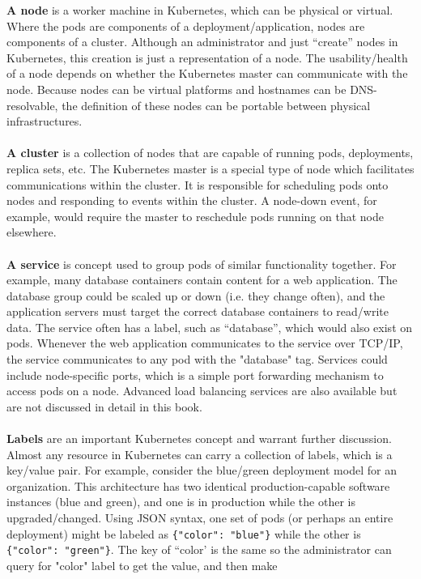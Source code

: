 \textbf{A node} is a worker machine in Kubernetes, which can be physical or
virtual. Where the pods are components of a deployment/application, nodes are
components of a cluster. Although an administrator and just ``create'' nodes in
Kubernetes, this creation is just a representation of a node. The
usability/health of a node depends on whether the Kubernetes master can
communicate with the node. Because nodes can be virtual platforms and
hostnames can be DNS-resolvable, the definition of these nodes can be portable
between physical infrastructures.
\\ \\
\textbf{A cluster} is a collection of nodes that are capable of running pods,
deployments, replica sets, etc. The Kubernetes master is a special type of
node which facilitates communications within the cluster. It is responsible
for scheduling pods onto nodes and responding to events within the cluster. A
node-down event, for example, would require the master to reschedule pods
running on that node elsewhere.
\\ \\
\textbf{A service} is concept used to group pods of similar functionality
together. For example, many database containers contain content for a web
application. The database group could be scaled up or down (i.e. they change
often), and the application servers must target the correct database
containers to read/write data. The service often has a label, such as
``database'', which would also exist on pods. Whenever the web application
communicates to the service over TCP/IP, the service communicates to any pod
with the "database" tag. Services could include node-specific ports, which is
a simple port forwarding mechanism to access pods on a node. Advanced load
balancing services are also available but are not discussed in detail in this book.
\\ \\
\textbf{Labels} are an important Kubernetes concept and warrant further
discussion. Almost any resource in Kubernetes can carry a collection of
labels, which is a key/value pair. For example, consider the blue/green
deployment model for an organization. This architecture has two identical
production-capable software instances (blue and green), and one is in
production while the other is upgraded/changed. Using JSON syntax, one set of
pods (or perhaps an entire deployment) might be labeled as \verb|{"color": "blue"}|
while the other is \verb|{"color": "green"}|. The key of ``color' is the same so
the administrator can query for "color" label to get the value, and then make
